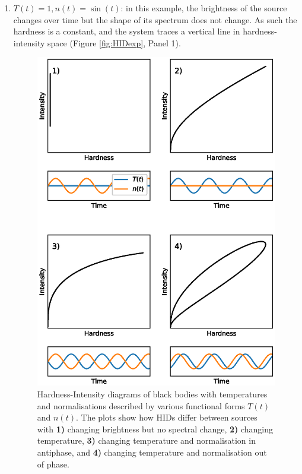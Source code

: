 \begin{enumerate}
\item $T(t)=1, n(t)=\sin(t)$: in this example, the brightness of the source changes over time but the shape of its spectrum does not change.  As such the hardness is a constant, and the system traces a vertical line in hardness-intensity space (Figure \ref{fig:HIDexp}, Panel 1).
\begin{figure}
    \includegraphics[width=\columnwidth, trim = 0mm 25mm 0mm 25mm]{images/hidexp.eps}
    \captionsetup{singlelinecheck=off}
    \caption[Hardness-Intensity diagrams of black bodies with temperatures and normalisations described by various functional forms.]{Hardness-Intensity diagrams of black bodies with temperatures and normalisations described by various functional forms $T(t)$ and $n(t)$.  The plots show how HIDs differ between sources with \textbf{1)} changing brightness but no spectral change, \textbf{2)} changing temperature, \textbf{3)} changing temperature and normalisation in antiphase, and \textbf{4)} changing temperature and normalisation out of phase.}

\end{figure}
\end{enumerate}
